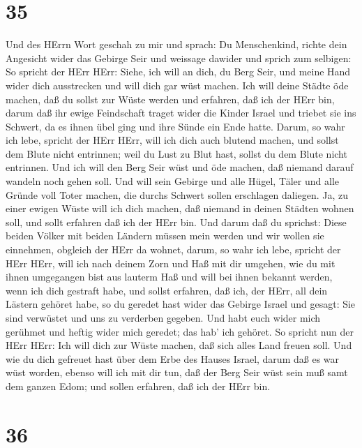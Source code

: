 \hypertarget{section-34}{%
\section{35}\label{section-34}}

 Und des HErrn Wort geschah zu mir und sprach: 
Du Menschenkind, richte dein Angesicht wider das Gebirge Seir und
weissage dawider  und sprich zum selbigen: So spricht der
HErr HErr: Siehe, ich will an dich, du Berg Seir, und meine Hand wider
dich ausstrecken und will dich gar wüst machen.  Ich will
deine Städte öde machen, daß du sollst zur Wüste werden und erfahren,
daß ich der HErr bin,  darum daß ihr ewige Feindschaft
traget wider die Kinder Israel und triebet sie ins Schwert, da es ihnen
übel ging und ihre Sünde ein Ende hatte.  Darum, so wahr ich
lebe, spricht der HErr HErr, will ich dich auch blutend machen, und
sollst dem Blute nicht entrinnen; weil du Lust zu Blut hast, sollst du
dem Blute nicht entrinnen.  Und ich will den Berg Seir wüst
und öde machen, daß niemand darauf wandeln noch gehen soll. 
Und will sein Gebirge und alle Hügel, Täler und alle Gründe voll Toter
machen, die durchs Schwert sollen erschlagen daliegen.  Ja,
zu einer ewigen Wüste will ich dich machen, daß niemand in deinen
Städten wohnen soll, und sollt erfahren daß ich der HErr bin.
 Und darum daß du sprichst: Diese beiden Völker mit beiden
Ländern müssen mein werden und wir wollen sie einnehmen, obgleich der
HErr da wohnet,  darum, so wahr ich lebe, spricht der HErr
HErr, will ich nach deinem Zorn und Haß mit dir umgehen, wie du mit
ihnen umgegangen bist aus lauterm Haß und will bei ihnen bekannt werden,
wenn ich dich gestraft habe,  und sollst erfahren, daß ich,
der HErr, all dein Lästern gehöret habe, so du geredet hast wider das
Gebirge Israel und gesagt: Sie sind verwüstet und uns zu verderben
gegeben.  Und habt euch wider mich gerühmet und heftig
wider mich geredet; das hab' ich gehöret.  So spricht nun
der HErr HErr: Ich will dich zur Wüste machen, daß sich alles Land
freuen soll.  Und wie du dich gefreuet hast über dem Erbe
des Hauses Israel, darum daß es war wüst worden, ebenso will ich mit dir
tun, daß der Berg Seir wüst sein muß samt dem ganzen Edom; und sollen
erfahren, daß ich der HErr bin.

\hypertarget{section-35}{%
\section{36}\label{section-35}}

